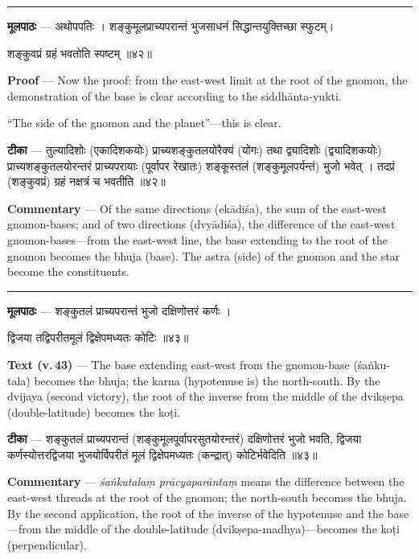 \documentclass[11pt,a4paper]{article}
\newcommand{\skt}[1]{{\devanagarifont\color{sktcolor} #1}}
\newenvironment{bilingual}{%
  \par\noindent
  \begin{minipage}[t]{0.47\textwidth}%
}{%
  \par\end{minipage}%
}
\newcommand{\rightcol}{%
  \par\end{minipage}%
  \hfill
  \begin{minipage}[t]{0.47\textwidth}%
}
\begin{document}
\medskip
\noindent\rule{\textwidth}{0.4pt}

\begin{bilingual}
\textbf{मूलपाठः} --- अथोपपतिः । शङ्कुमूलप्राच्यपरान्तं भुजसाधनं सिद्धान्तयुक्तिच्छा स्फुटम्।

\skt{शङ्कुवप्रं ग्रहं भवतोति स्पष्टम्} ॥४२॥
\rightcol
\textbf{Proof} --- Now the proof: from the east-west limit at the root of the gnomon, the demonstration of the base is clear according to the siddhānta-yukti.

``The side of the gnomon and the planet''---this is clear.
\end{bilingual}

\medskip

\begin{bilingual}
\textbf{टीका} --- \skt{तुल्यादिशोः} (एकादिशकयोः) प्राच्यशङ्कुतलयोरैक्यं (योगः) तथा द्व्यादिशोः (द्व्यादिशकयोः) प्राच्यशङ्कुतलयोरन्तरं प्राच्यपरायाः (पूर्वापर रेखातः) शङ्कूस्तलं (शङ्कुमूलपर्यन्तं) भुजो भवेत् । तदप्रं (शङ्कुवप्रं) ग्रहं नक्षत्रं च भवतीति ॥४२॥
\rightcol
\textbf{Commentary} --- Of the same directions (ekādiśa), the sum of the east-west gnomon-bases; and of two directions (dvyādiśa), the difference of the east-west gnomon-bases---from the east-west line, the base extending to the root of the gnomon becomes the bhuja (base). The astra (side) of the gnomon and the star become the constituents.
\end{bilingual}

\medskip
\noindent\rule{\textwidth}{0.4pt}

\begin{bilingual}
\textbf{मूलपाठः} --- \skt{शङ्कुतलं प्राच्यपरान्तं भुजो दक्षिणोत्तरं कर्णः} ।

\skt{द्विजया तद्विपरीतमूलं द्विक्षेपमध्यतः कोटिः} ॥४३॥
\rightcol
\textbf{Text (v.\,43)} --- The base extending east-west from the gnomon-base (śaṅku-tala) becomes the bhuja; the karna (hypotenuse is) the north-south. By the dvijaya (second victory), the root of the inverse from the middle of the dvikṣepa (double-latitude) becomes the koṭi.
\end{bilingual}

\medskip

\begin{bilingual}
\textbf{टीका} --- \skt{शङ्कुतलं प्राच्यपरान्तं} (शङ्कुमूलपूर्वापरसुतयोरन्तरं) दक्षिणोत्तरं भुजो भवति, द्विजया कर्णस्योत्तरद्विजया भुजयोर्विपरीतं मूलं द्विक्षेपमध्यतः (कन्द्रात्) कोटिर्भवेदिति ॥४३॥
\rightcol
\textbf{Commentary} --- \textit{śaṅkutalaṃ prācyaparāntaṃ} means the difference between the east-west threads at the root of the gnomon; the north-south becomes the bhuja. By the second application, the root of the inverse of the hypotenuse and the base---from the middle of the double-latitude (dvikṣepa-madhya)---becomes the koṭi (perpendicular).
\end{bilingual}
\end{document}
